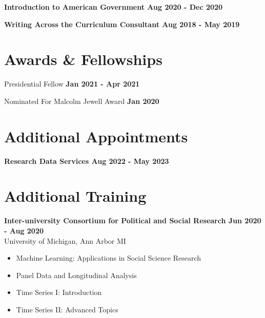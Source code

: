 \documentclass[margin]{res}
\newcommand{\fullhrulefill}{%
  \hspace*{-\sectionwidth}\hrulefill%
  }
\begin{document}
\begin{resume}
\textbf {Introduction to American Government \hfill {Aug 2020 - Dec 2020} \\ }

\textbf {Writing Across the Curriculum Consultant \hfill {Aug 2018 - May 2019} \\ }

\fullhrulefill

\section{Awards \& Fellowships}


Presidential Fellow \hfill{\textbf{Jan 2021 - Apr 2021 }} \\  

Nominated For Malcolm Jewell Award \hfill{\textbf{Jan 2020}} \\

\fullhrulefill

\section{Additional Appointments}

\textbf{Research Data Services \hfill {Aug 2022 - May 2023} \\ }



\fullhrulefill
\section{Additional Training}
\textbf{Inter-university Consortium for Political and Social Research \hfill{Jun 2020 - Aug 2020}}\\ University of Michigan, Ann Arbor MI \\ 
\begin{itemize}
	\item Machine Learning: Applications in Social Science Research
	\item Panel Data and Longitudinal Analysis
	\item Time Series I: Introduction
	\item Time Series II: Advanced Topics
\end{itemize}

\fullhrulefill



\end{resume}
\end{document}
